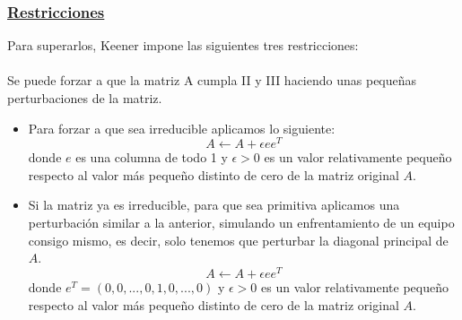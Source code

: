 \subsubsection*{\underline{Restricciones}}
Para superarlos, Keener impone las siguientes tres restricciones:\\
\ \\
Se puede forzar a que la matriz A cumpla II y III haciendo unas pequeñas perturbaciones de la matriz.
\begin{itemize}
	\item Para forzar a que sea irreducible aplicamos lo siguiente:
	\begin{equation*}
	A \leftarrow A + \epsilon e e^{T}
	\end{equation*}
	donde $e$ es una columna de todo 1 y $\epsilon>0$ es un valor relativamente pequeño respecto al valor más pequeño distinto de cero de la matriz original $A$.\\ 
	\item Si la matriz ya es irreducible, para que sea primitiva aplicamos una perturbación similar a la anterior, simulando un enfrentamiento de un equipo consigo mismo, es decir, solo tenemos que perturbar la diagonal principal de $A$.
	\begin{equation*}
	A \leftarrow A + \epsilon e e^{T}
	\end{equation*}
	donde $e^{T} = \left( 0,0,...,0,1,0,...,0 \right) $ y $\epsilon>0$ es un valor relativamente pequeño respecto al valor más pequeño distinto de cero de la matriz original $A$.\\
\end{itemize}

